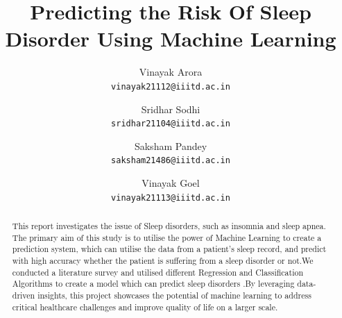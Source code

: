 \documentclass[10pt,twocolumn,letterpaper]{article}
\begin{document}
\title{Predicting the Risk Of Sleep Disorder Using Machine Learning}

\author{Vinayak Arora\\
{\tt\small vinayak21112@iiitd.ac.in}
\and
Sridhar Sodhi\\
{\tt\small sridhar21104@iiitd.ac.in}
\and
Saksham Pandey\\
{\tt\small saksham21486@iiitd.ac.in}
\and
Vinayak Goel\\
{\tt\small vinayak21113@iiitd.ac.in}
}

\maketitle
\thispagestyle{empty}

\begin{abstract}
   This report investigates the issue of Sleep disorders, such as insomnia and sleep apnea. The primary aim of this study is to utilise the power of Machine Learning to create a prediction system, which can utilise the data from a patient's sleep record, and predict with high accuracy whether the patient is suffering from a sleep disorder or not.We conducted a literature survey and utilised different Regression and Classification Algorithms to create a model which can predict sleep disorders .By leveraging data-driven insights, this project showcases the potential of machine learning to address critical healthcare challenges and improve quality of life on a larger scale.
\end{abstract}
\end{document}
